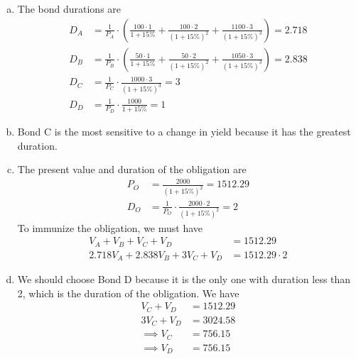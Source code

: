 \documentclass{article}
\begin{document}
\begin{enumerate}
\begin{enumerate}[(a)]
			\item 
				\begin{soln}
					The bond durations are
					\begin{align*}
						D_A &= \frac{1}{P_A}\cdot \left( \frac{100\cdot 1}{1+15\%} + \frac{100\cdot 2}{(1+15\%)^2} + \frac{1100\cdot 3}{(1+15\%)^3} \right) = 2.718 \\
						D_B &= \frac{1}{P_B}\cdot\left( \frac{50\cdot 1}{1+15\%} + \frac{50\cdot 2}{(1+15\%)^2} + \frac{1050\cdot 3}{(1+15\%)^3} \right) = 2.838 \\
						D_C &= \frac{1}{P_C}\cdot \frac{1000\cdot 3}{(1+15\%)^3} = 3 \\
						D_D &= \frac{1}{P_D}\cdot \frac{1000}{1+15\%} = 1
					\end{align*}	
				\end{soln}

			\item 
				\begin{soln}
					Bond C is the most sensitive to a change in yield because it has the greatest duration.
				\end{soln}

			\item 
				\begin{soln}
					The present value and duration of the obligation are
					\begin{align*}
						P_O &= \frac{2000}{(1+15\%)^2} = 1512.29 \\
						D_O &= \frac{1}{P_O} \cdot \frac{2000\cdot 2}{(1+15\%)^2} = 2
					\end{align*}
					To immunize the obligation, we must have
					\begin{align*}
						V_A+V_B+V_C+V_D &= 1512.29 \\
						2.718V_A + 2.838V_B + 3V_C + V_D &= 1512.29\cdot 2
					\end{align*}
				\end{soln}
				
			\item 
				\begin{soln}
					We should choose Bond D because it is the only one with duration less than 2, which is the duration of the obligation. We have
					\begin{align*}
						V_C + V_D &= 1512.29 \\
						3V_C + V_D &= 3024.58 \\
						\implies V_C &= 756.15 \\
						\implies V_D &= 756.15
					\end{align*}
				\end{soln}


\end{enumerate}
\end{enumerate}
\end{document}
